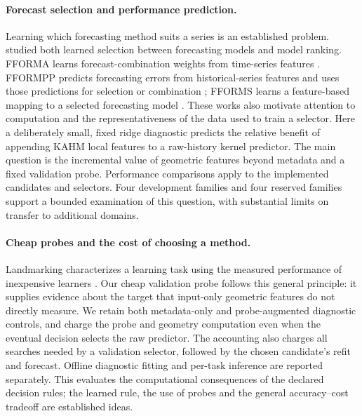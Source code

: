 \paragraph{Forecast selection and performance prediction.}
Learning which forecasting method suits a series is an established problem.
\citet{Prudencio2004MetaLearning} studied both learned selection between
forecasting models and model ranking. FFORMA learns forecast-combination
weights from time-series features \citep{MonteroManso2020FFORMA}.
FFORMPP predicts forecasting errors from historical-series features and
uses those predictions for selection or combination
\citep{Talagala2022FFORMPP}; FFORMS learns a feature-based mapping to a
selected forecasting model \citep{Talagala2023FFORMS}. These works also
motivate attention to computation and the representativeness of the data
used to train a selector. Here a deliberately small, fixed ridge diagnostic
predicts the relative benefit of appending KAHM local features to a raw-history
kernel predictor. The main question is the incremental value of geometric
features beyond metadata and a fixed validation probe. Performance comparisons
apply to the implemented candidates and selectors. Four development families
and four reserved families support a bounded examination of this question,
with substantial limits on transfer to additional domains.

\paragraph{Cheap probes and the cost of choosing a method.}
Landmarking characterizes a learning task using the measured performance of
inexpensive learners \citep{Pfahringer2000Landmarking}. Our cheap validation
probe follows this general principle: it supplies evidence about the target
that input-only geometric features do not directly measure. We retain both
metadata-only and probe-augmented diagnostic controls, and charge the probe
and geometry computation even when the eventual decision selects the raw
predictor. The accounting also charges all searches needed by a validation
selector, followed by the chosen candidate's refit and forecast. Offline
diagnostic fitting and per-task inference are reported separately. This
evaluates the computational consequences of the declared decision rules;
the learned rule, the use of probes and the general accuracy--cost tradeoff
are established ideas.

